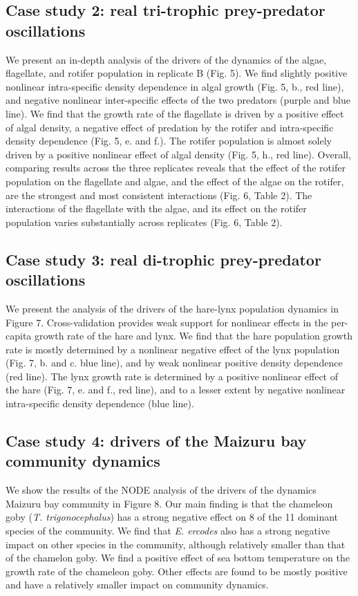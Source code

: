 \documentclass[11pt, oneside]{article}
\begin{document}
\subsection{Case study 2: real tri-trophic prey-predator oscillations}

We present an in-depth analysis of the drivers of the dynamics of the algae, flagellate, and rotifer population in replicate B (Fig. 5).
We find slightly positive nonlinear intra-specific density dependence in algal growth (Fig. 5, b., red line), and negative nonlinear inter-specific effects of the two predators (purple and blue line).
We find that the growth rate of the flagellate is driven by a positive effect of algal density, a negative effect of predation by the rotifer and intra-specific density dependence (Fig. 5, e. and f.).
The rotifer population is almost solely driven by a positive nonlinear effect of algal density (Fig. 5, h., red line).
Overall, comparing results across the three replicates reveals that the effect of the rotifer population on the flagellate and algae, and the effect of the algae on the rotifer, are the strongest and most consistent interactions (Fig. 6, Table 2).
The interactions of the flagellate with the algae, and its effect on the rotifer population varies substantially across replicates (Fig. 6, Table 2). 

\subsection{Case study 3: real di-trophic prey-predator oscillations}

We present the analysis of the drivers of the hare-lynx population dynamics in Figure 7.
Cross-validation provides weak support for nonlinear effects in the per-capita growth rate of the hare and lynx.
We find that the hare population growth rate is mostly determined by a nonlinear negative effect of the lynx population (Fig. 7, b. and c. blue line), and by weak nonlinear positive density dependence (red line). 
The lynx growth rate is determined by a positive nonlinear effect of the hare (Fig. 7, e. and f., red line), and to a lesser extent by negative nonlinear intra-specific density dependence (blue line).

\subsection{Case study 4: drivers of the Maizuru bay community dynamics}

We show the results of the NODE analysis of the drivers of the dynamics Maizuru bay community in Figure 8.
Our main finding is that the chameleon goby (\textit{T. trigonocephalus}) has a strong negative effect on 8 of the 11 dominant species of the community. 
We find that \textit{E. ercodes} also has a strong negative impact on other species in the community, although relatively smaller than that of the chamelon goby.
We find a positive effect of sea bottom temperature on the growth rate of the chameleon goby.
Other effects are found to be mostly positive and have a relatively smaller impact on community dynamics.
\end{document}
